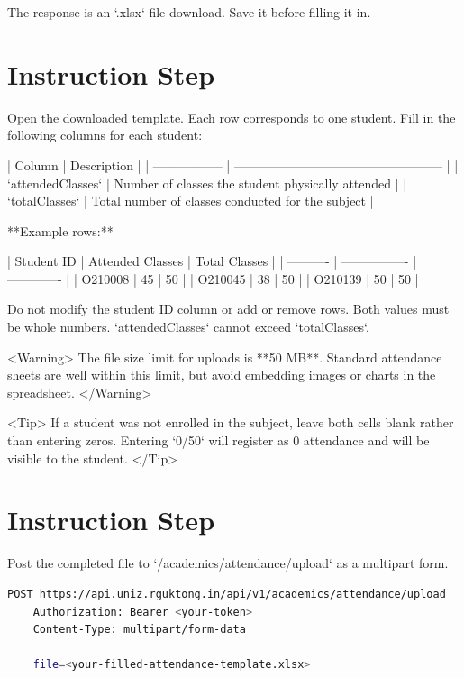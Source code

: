     The response is an `.xlsx` file download. Save it before filling it in.

  

  
\section{Instruction Step}

    Open the downloaded template. Each row corresponds to one student. Fill in
    the following columns for each student:

    | Column            | Description                                        |
    | ----------------- | -------------------------------------------------- |
    | `attendedClasses` | Number of classes the student physically attended  |
    | `totalClasses`    | Total number of classes conducted for the subject  |

    **Example rows:**

    | Student ID | Attended Classes | Total Classes |
    | ---------- | ---------------- | ------------- |
    | O210008    | 45               | 50            |
    | O210045    | 38               | 50            |
    | O210139    | 50               | 50            |

    Do not modify the student ID column or add or remove rows. Both values must
    be whole numbers. `attendedClasses` cannot exceed `totalClasses`.

    <Warning>
      The file size limit for uploads is **50 MB**. Standard attendance sheets
      are well within this limit, but avoid embedding images or charts in the
      spreadsheet.
    </Warning>

    <Tip>
      If a student was not enrolled in the subject, leave both cells blank
      rather than entering zeros. Entering `0/50` will register as 0%
      attendance and will be visible to the student.
    </Tip>

  

  
\section{Instruction Step}

    Post the completed file to `/academics/attendance/upload` as a multipart
    form.

    \begin{lstlisting}[language=bash]
    POST https://api.uniz.rguktong.in/api/v1/academics/attendance/upload
    Authorization: Bearer <your-token>
    Content-Type: multipart/form-data

    file=<your-filled-attendance-template.xlsx>
    
\end{lstlisting}

